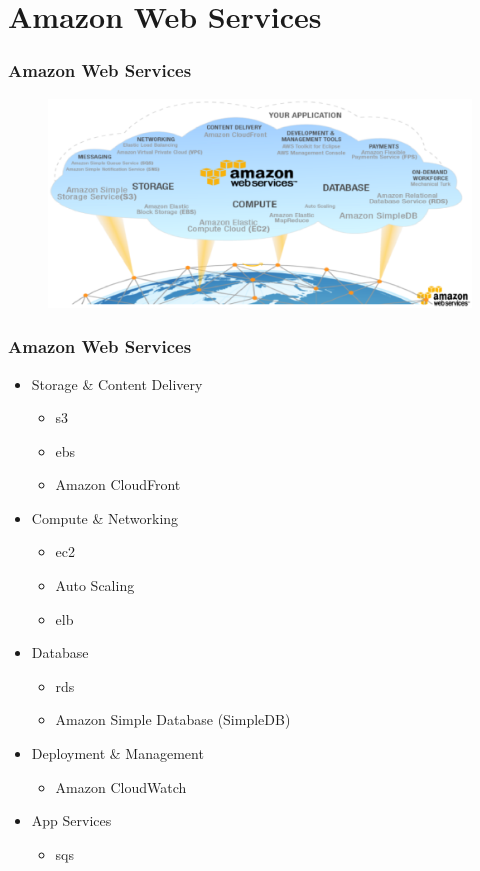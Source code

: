 \documentclass{beamer}
\begin{document}
\section[Amazon Web Services]{Amazon Web Services}
\begin{frame}
\frametitle{Amazon Web Services}
\begin{figure}
  \includegraphics[width= 1.0 \textwidth]{infraestructura-tecnologica-de-amazon-web-services-para-brindar-servicios-cloud-saas-iaas-y-paas.eps}
\end{figure}
\end{frame}
\begin{frame}
\frametitle{Amazon Web Services}
\begin{itemize}
 \item Storage \& Content Delivery
  \begin{itemize}
    \item \gls{s3}
    \item \gls{ebs}
    \item Amazon CloudFront
  \end{itemize}  
\item Compute \& Networking
  \begin{itemize}
    \item \gls{ec2}
    \item Auto Scaling
    \item \gls{elb}
  \end{itemize}
  \item Database
  \begin{itemize}
    \item \gls{rds}
    \item Amazon Simple Database (SimpleDB)
  \end{itemize}
  \item Deployment \& Management
  \begin{itemize}
    \item Amazon CloudWatch
  \end{itemize}
  \item App Services
  \begin{itemize}
    \item \gls{sqs}
  \end{itemize}
\end{itemize}
\end{frame}
\end{document}
